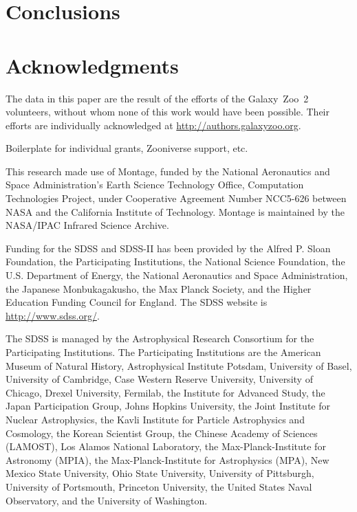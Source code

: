 \documentclass[useAMS,usenatbib]{mn2e}
\begin{document}

\section{Conclusions}\label{sec_conclusions}


\section*{Acknowledgments}
The data in this paper are the result of the efforts of the Galaxy~Zoo~2 volunteers, without whom none of this work would have been possible. Their efforts are individually acknowledged at \url{http://authors.galaxyzoo.org}. 

Boilerplate for individual grants, Zooniverse support, etc.

This research made use of Montage, funded by the National Aeronautics and Space Administration's Earth Science Technology Office, Computation Technologies Project, under Cooperative Agreement Number NCC5-626 between NASA and the California Institute of Technology. Montage is maintained by the NASA/IPAC Infrared Science Archive.

Funding for the SDSS and SDSS-II has been provided by the Alfred P. Sloan Foundation, the Participating Institutions, the National Science Foundation, the U.S. Department of Energy, the National Aeronautics and Space Administration, the Japanese Monbukagakusho, the Max Planck Society, and the Higher Education Funding Council for England. The SDSS website is \url{http://www.sdss.org/}.

The SDSS is managed by the Astrophysical Research Consortium for the Participating Institutions. The Participating Institutions are the American Museum of Natural History, Astrophysical Institute Potsdam, University of Basel, University of Cambridge, Case Western Reserve University, University of Chicago, Drexel University, Fermilab, the Institute for Advanced Study, the Japan Participation Group, Johns Hopkins University, the Joint Institute for Nuclear Astrophysics, the Kavli Institute for Particle Astrophysics and Cosmology, the Korean Scientist Group, the Chinese Academy of Sciences (LAMOST), Los Alamos National Laboratory, the Max-Planck-Institute for Astronomy (MPIA), the Max-Planck-Institute for Astrophysics (MPA), New Mexico State University, Ohio State University, University of Pittsburgh, University of Portsmouth, Princeton University, the United States Naval Observatory, and the University of Washington.
\end{document}
